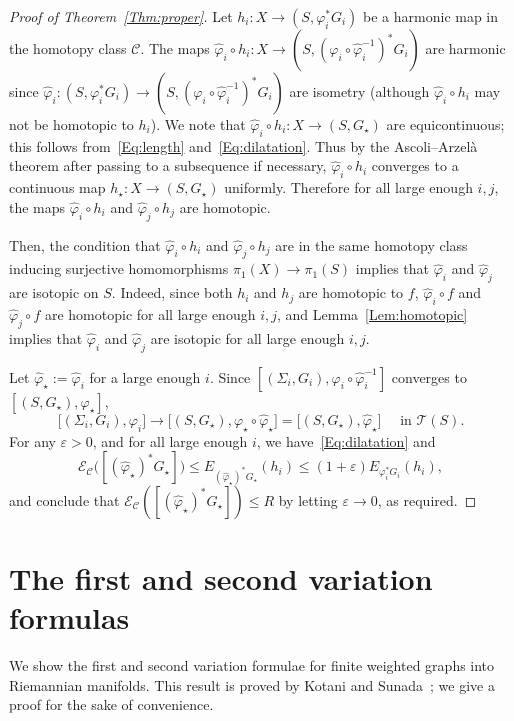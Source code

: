 \documentclass[11pt]{article}
\theoremstyle{definition}
\numberwithin{equation}{section}
\renewcommand{\SS}{\Sigma}
\newcommand{\e}{\varepsilon}
\newcommand{\f}{\varphi}
\newcommand{\Cc}{\mathcal{C}}
\newcommand{\Ec}{\mathcal{E}}
\newcommand{\Tc}{\mathcal{T}}
\newcommand*\wh{\widehat}
\begin{document}
\begin{proof}[{Proof of Theorem~\ref{Thm:proper}}]
Let $h_i:X \to (S, \f_i^\ast G_i)$ be a harmonic map in the homotopy class $\Cc$. The maps $\wh \f_i \circ h_i:X \to (S, (\f_i \circ \wh \f_i^{-1})^\ast G_i)$ are harmonic since $\wh \f_i: (S, \f_i^\ast G_i) \to (S, (\f_i \circ \wh \f_i^{-1})^\ast G_i)$ are isometry (although $\wh \f_i \circ h_i$ may not be homotopic to $h_i$). We note that $\wh \f_i \circ h_i: X \to (S, G_\star)$ are equicontinuous; this follows from~\eqref{Eq:length} and~\eqref{Eq:dilatation}. Thus by the Ascoli--Arzel\`a theorem after passing to a subsequence if necessary, $\wh \f_i \circ h_i$ converges to a continuous map $h_\star: X \to (S, G_\star)$ uniformly. Therefore for all large enough $i, j$, the maps $\wh \f_i \circ h_i$ and $\wh \f_j \circ h_j$ are homotopic.

Then, the condition that $\wh \f_i \circ h_i$ and $\wh \f_j \circ h_j$ are in the same homotopy class inducing surjective homomorphisms $\pi_1(X) \to \pi_1(S)$ implies that $\wh \f_i$ and $\wh \f_j$ are isotopic on $S$. Indeed, since both $h_i$ and $h_j$ are homotopic to $f$, $\wh \f_i \circ f$ and $\wh \f_j \circ f$ are homotopic for all large enough $i, j$, and Lemma~\ref{Lem:homotopic} implies that $\wh \f_i$ and $\wh \f_j$ are isotopic for all large enough $i, j$.

Let $\wh \f_\star:=\wh \f_i$ for a large enough $i$. Since $[(\SS_i, G_i), \f_i \circ \wh \f_i^{-1}]$ converges to $[(S, G_\star), \f_\star]$,
\[
\big[\left(\SS_i, G_i\right), \f_i\big] \to \big[\left(S, G_\star\right), \f_\star \circ \wh \f_\star\big]=\big[\left(S, G_\star\right), \wh \f_\star\big] \quad \text{ in }\Tc(S).
\]
For any $\e>0$, and for all large enough $i$, we have~\eqref{Eq:dilatation} and
\[
\Ec_\Cc\big(\left[\left(\wh \f_\star\right)^\ast G_\star\right]\big) \le E_{\left(\wh \f_\star\right)^\ast G_\star}\left(h_i\right) \le (1+\e)E_{\f_i^\ast G_i}(h_i),
\]
and conclude that $\Ec_\Cc([(\wh \f_\star)^\ast G_\star]) \le R$ by letting $\e \to 0$, as required.
\end{proof}

\appendix

\section{The first and second variation formulas}

We show the first and second variation formulae for finite weighted graphs into Riemannian manifolds. This result is proved by Kotani and Sunada~\cite[Theorem~2.1]{KotaniSunadaStandard}; we give a proof for the sake of convenience.
\end{document}
